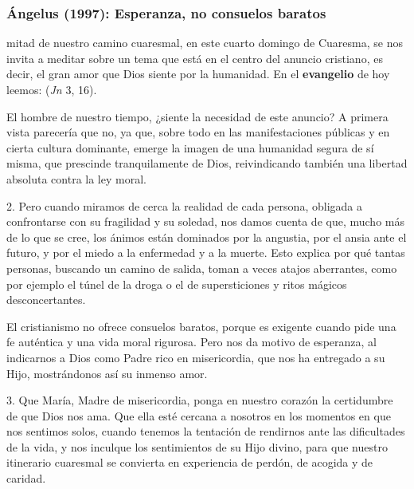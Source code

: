 \newpage

\subsubsection{Ángelus (1997): Esperanza, no consuelos baratos}


\begin{body}
 mitad de nuestro camino cuaresmal, en este cuarto domingo de Cuaresma, se nos invita a meditar sobre un tema que está en el centro del anuncio cristiano, es decir, el gran amor que Dios siente por la humanidad. En el \textbf{evangelio} de hoy leemos:  (\textit{Jn} 3, 16).

El hombre de nuestro tiempo, ¿siente la necesidad de este anuncio? A primera vista parecería que no, ya que, sobre todo en las manifestaciones públicas y en cierta cultura dominante, emerge la imagen de una humanidad segura de sí misma, que prescinde tranquilamente de Dios, reivindicando también una libertad absoluta contra la ley moral.

2. Pero cuando miramos de cerca la realidad de cada persona, obligada a confrontarse con su fragilidad y su soledad, nos damos cuenta de que, mucho más de lo que se cree, los ánimos están dominados por la angustia, por el ansia ante el futuro, y por el miedo a la enfermedad y a la muerte. Esto explica por qué tantas personas, buscando un camino de salida, toman a veces atajos aberrantes, como por ejemplo el túnel de la droga o el de supersticiones y ritos mágicos desconcertantes.

El cristianismo no ofrece consuelos baratos, porque es exigente cuando pide una fe auténtica y una vida moral rigurosa. Pero nos da motivo de esperanza, al indicarnos a Dios como Padre rico en misericordia, que nos ha entregado a su Hijo, mostrándonos así su inmenso amor.

3. Que María, Madre de misericordia, ponga en nuestro corazón la certidumbre de que Dios nos ama. Que ella esté cercana a nosotros en los momentos en que nos sentimos solos, cuando tenemos la tentación de rendirnos ante las dificultades de la vida, y nos inculque los sentimientos de su Hijo divino, para que nuestro itinerario cuaresmal se convierta en experiencia de perdón, de acogida y de caridad.
\end{body}

